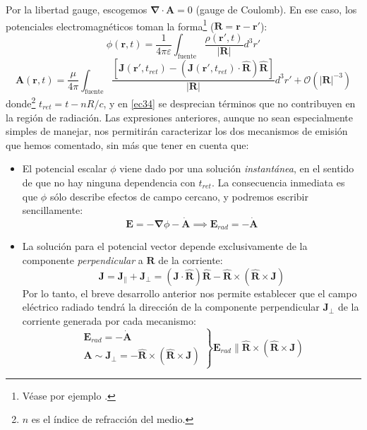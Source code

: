 \documentclass[12 pt, a4paper]{article} %
\numberwithin{equation}{section}
\numberwithin{figure}{section}
\newcommand{\vect}[1]{\boldsymbol{\mathbf{#1}}}
\begin{document}
Por la libertad gauge, escogemos $\vect{\nabla}\cdot \vect{A}=0$ (gauge de Coulomb). En ese caso, los potenciales electromagnéticos toman la forma\footnote{ Véase por ejemplo \cite{Jackson2002}.} ($\vect{R}=\vect{r}-\vect{r}'$):
\begin{equation}
	\phi(\vect{r}, t)=\frac{1}{4\pi\varepsilon}\int_{\text{fuente}} \frac{\rho(\vect{r}', t)}{\left|\vect{R}\right|}d^3r'\label{ec33}
\end{equation}
\begin{equation}
	\vect{A}\left(\vect{r}, t\right)=\frac{\mu}{4\pi}\int_{\text{fuente}}\frac{\left[\vect{J}\left(\vect{r}', t_{ret}\right)-\left(\vect{J}\left(\vect{r}', t_{ret}\right)\cdot \hat{\vect{R}}\right)\hat{\vect{R}}\right]}{\left|\vect{R}\right|}d^3r'+\mathcal{O}(\left|\vect{R}\right|^{-3})\label{ec34}
\end{equation}
donde\footnote{ $n$ es el índice de refracción del medio.} $t_{ret}=t-nR/c$, y en \eqref{ec34} se desprecian términos que no contribuyen en la región de radiación. Las expresiones anteriores, aunque no sean especialmente simples de manejar, nos permitirán caracterizar los dos mecanismos de emisión que hemos comentado, sin más que tener en cuenta que:
\begin{itemize}
	\item El potencial escalar $\phi$ viene dado por una solución \textit{instantánea}, en el sentido de que no hay ninguna dependencia con $t_{ret}$. La consecuencia inmediata es que $\phi$ sólo describe efectos de campo cercano, y podremos escribir sencillamente:
	\begin{equation}
		\vect{E}=-\vect{\nabla}\phi-\dot{\vect{A}}\implies \vect{E}_{rad} = -\dot{\vect{A}}\label{ec35}
	\end{equation}
\item La solución para el potencial vector depende exclusivamente de la componente \textit{perpendicular} a $\vect{R}$ de la corriente:
\begin{equation}
	\vect{J}=\vect{J}_\parallel+\vect{J}_\perp = \left(\vect{J}\cdot\hat{\vect{R}}\right)\hat{\vect{R}}-\hat{\vect{R}}\times\left(\hat{\vect{R}}\times\vect{J}\right)\label{ec36}
\end{equation} 
Por lo tanto, el breve desarrollo anterior nos permite establecer que el campo eléctrico radiado tendrá la dirección de la componente perpendicular $\vect{J}_\perp$ de la corriente generada por cada mecanismo:
\begin{equation}
	\left.
	\begin{array}{c}
		\vect{E}_{rad} = -\dot{\vect{A}}\\
		\vect{A}\sim\vect{J}_\perp=-\hat{\vect{R}}\times\left(\hat{\vect{R}}\times\vect{J}\right)
	\end{array}
\right\}\vect{E}_{rad}\parallel  \hat{\vect{R}}\times\left(\hat{\vect{R}}\times\vect{J}\right)\label{ec37}
\end{equation}
\end{itemize}
\end{document}
